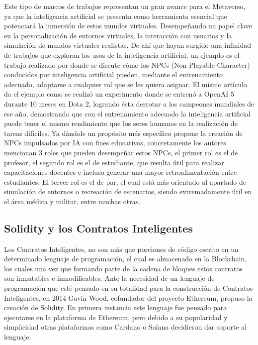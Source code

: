 \documentclass[a4paper,10pt]{article}
\begin{document}
	Este tipo de marcos de trabajos representan un gran avance para el Metaverso, ya que la inteligencia artificial se presenta como herramienta esencial que potenciará la inmersión de estos mundos virtuales. Desempeñando un papel clave en la personalización de entornos virtuales, la interacción con usuarios y la simulación de mundos virtuales realistas. De ahí que hayan surgido una infinidad de trabajos que exploran los usos de la inteligencia artificial, un ejemplo es el trabajo realizado por \textcite{yang2022fusing} donde se discute cómo los NPCs (Non Playable Character) conducidos por inteligencia artificial pueden, mediante el entrenamiento adecuado, adaptarse a cualquier rol que se les quiera asignar. El mismo artículo da el ejemplo como se realizó un experimento donde se entrenó a OpenAI 5 durante 10 meses en Dota 2, logrando ésta derrotar a los campeones mundiales de ese año, demostrando que con el entrenamiento adecuado la inteligencia artificial puede tener el mismo rendimiento que los seres humanos en la realización de tareas difíciles. Ya dándole un propósito más específico \textcite{hwang2022definition} propone la creación de NPCs impulsados por IA con fines educativos, concretamente los autores mencionan 3 roles que pueden desempeñar estos NPCs, el primer rol es el de profesor, el segundo rol es el de estudiante, que resulta útil para realizar capacitaciones docentes e incluso generar una mayor retroalimentación entre estudiantes. El tercer rol es el de par, el cual está más orientado al apartado de simulación de entornos o recreación de escenarios, siendo extremadamente útil en el área médica y militar, entre muchas otras.
	
	\subsection{Solidity y los Contratos Inteligentes}
	\label{seccion2.2}
	Los Contratos Inteligentes, no son más que porciones de código escrito en un determinado lenguaje de programación, el cual es almacenado en la Blockchain, los cuales una vez que formando parte de la cadena de bloques estos contratos son inmutables e inmodificables. Ante la necesidad de un lenguaje de programación que esté pensado en su totalidad para la construcción de Contratos Inteligentes, en 2014 Gavin Wood, cofundador del proyecto Ethereum, propuso la creación de Solidity. En primera instancia este lenguaje fue pensado para ejecutarse en la plataforma de Ethereum, pero debido a su popularidad y simplicidad otras plataformas como Cardano o Solana decidieron dar soporte al lenguaje.
	
\end{document}
